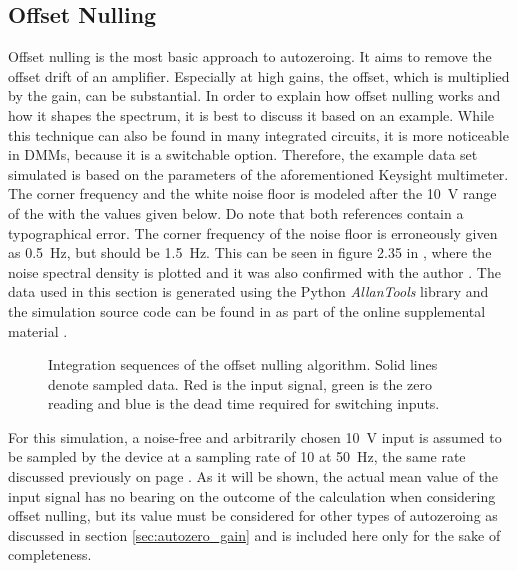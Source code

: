 \subsection{Offset Nulling}%
\label{sec:autozero_offset_nulling}
Offset nulling is the most basic approach to autozeroing. It aims to remove the offset drift of an amplifier. Especially at high gains, the offset, which is multiplied by the gain, can be substantial. In order to explain how offset nulling works and how it shapes the spectrum, it is best to discuss it based on an example. While this technique can also be found in many integrated circuits, it is more noticeable in DMMs, because it is a switchable option. Therefore, the example data set simulated is based on the parameters of the aforementioned Keysight  multimeter. The corner frequency and the white noise floor is modeled after the \qty{10}{\V} range of the  \cite{3458A_noise_floor, sampling_with_3458A} with the values given below. Do note that both references \cite{3458A_noise_floor, sampling_with_3458A} contain a typographical error. The corner frequency of the noise floor is erroneously given as \qty{0.5}{\Hz}, but should be \qty{1.5}{\Hz}. This can be seen in figure 2.35 in \citep[p. 116]{sampling_with_3458A}, where the noise spectral density is plotted and it was also confirmed with the author \cite{lapuh_email_corner_frequency}. The data used in this section is generated using the Python \textit{AllanTools} library \cite{allantools} and the simulation source code can be found in  as part of the online supplemental material \cite{supplemental_material}.
\begin{figure}[ht]
    \centering
    \caption{Integration sequences of the offset nulling algorithm. Solid lines denote sampled data. Red is the input signal, green is the zero reading and blue is the dead time required for switching inputs.}
    \label{fig:dmm_autozer_offset_nulling}
\end{figure}

For this simulation, a noise-free and arbitrarily chosen \qty{10}{\V} input is assumed to be sampled by the device at a sampling rate of \qty{10}{\plc} at \qty{50}{\Hz}, the same rate discussed previously on page \pageref{sec:dead_time}. As it will be shown, the actual mean value of the input signal has no bearing on the outcome of the calculation when considering offset nulling, but its value must be considered for other types of autozeroing as discussed in section \ref{sec:autozero_gain} and is included here only for the sake of completeness.

